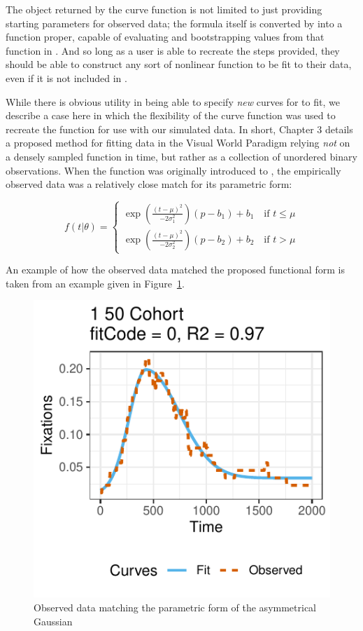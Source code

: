 The object returned by the curve function is not limited to just providing starting parameters for observed data; the formula itself is converted by  into a function proper, capable of evaluating and bootstrapping values from that function in . And so long as a user is able to recreate the steps provided, they should be able to construct any sort of nonlinear function to be fit to their data, even if it is not included in .

While there is obvious utility in being able to specify \textit{new} curves for  to fit, we describe a case here in which the flexibility of the curve function was used to recreate the  function for use with our simulated data. In short, Chapter 3 details a proposed method for fitting data in the Visual World Paradigm relying \textit{not} on a densely sampled function in time, but rather as a collection of unordered binary observations. When the  function was originally introduced to , the empirically observed data was a relatively close match for its parametric form:

\begin{equation}
f(t|\theta) = \begin{cases}
\exp \left( \frac{(t - \mu)^2}{-2\sigma_1^2} \right) (p - b_1) + b_1 \quad \text{if } t \leq \mu \\
\exp \left( \frac{(t - \mu)^2}{-2\sigma_2^2} \right) (p - b_2) + b_2 \quad \text{if } t > \mu
\end{cases}
\end{equation}

An example of how the observed data matched the proposed functional form is taken from an example given in Figure~\ref{fig:bdots_log}.

\begin{figure}[H]
\centering
\includegraphics[scale=1]{img/bdots_logistic.pdf}
\caption{Observed data matching the parametric form of the asymmetrical Gaussian}
\label{fig:bdots_log}
\end{figure}

